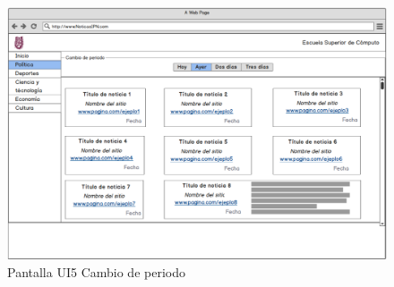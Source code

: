 \begin{figure}
  \centering
  \includegraphics[scale=.32]{imagenes/Pantallas/UI5}
  \caption{Pantalla UI5 Cambio de periodo}
  \label{fig:UI5}
\end{figure}
